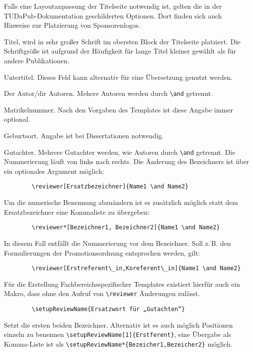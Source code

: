 \documentclass[
	german,%
	accentcolor=9c,%
	ruledheaders=section,%
	class=report,%
	thesis={type=bachelor},%
	fontsize=11pt,%
	parskip=half-,%
	custommargins=true,%
	marginpar=false,%
]{tudapub}
\begin{document}
Falls eine Layoutanpassung der Titelseite notwendig ist, gelten die in der TUDaPub-Dokumentation \cite{tudapub} geschilderten Optionen. Dort finden sich auch Hinweise zur Platzierung von Sponsorenlogos.

\begin{description}
	\item[title] Titel, wird in sehr großer Schrift im obersten Block der Titelseite platziert. Die Schriftgröße ist aufgrund der Häufigkeit für lange Titel kleiner gewählt als für andere Publikationen.
	\item[subtitle] Untertitel. Dieses Feld kann alternativ für eine Übersetzung genutzt werden.
	\item[author] Der Autor/dir Autoren. Mehere Autoren werden durch \verb+\and+ getrennt.
	\item[studentID] Matrikelnummer. Nach den Vorgaben des Templates ist diese Angabe immer optional.
	\item[birthplace] Geburtsort. Angabe ist bei Dissertationen notwendig.
	\item[reviewer] Gutachter. Mehrere Gutachter werden, wie Autoren durch \verb+\and+ getrennt. Die Nummerierung läuft von links nach rechts.
	      Die Änderung des Bezeichners ist über ein optionales Argument möglich:
\begin{verbatim}
        \reviewer[Ersatzbezeichner]{Name1 \and Name2}
\end{verbatim}
	      Um die numerische Benennung abzuändern ist es zusätzlich möglich statt dem Ersatzbezeichner eine Kommaliste zu übergeben:
\begin{verbatim}
        \reviewer*[Bezeichner1, Bezeichner2]{Name1 \and Name2}
\end{verbatim}
	      In diesem Fall entfällt die Nummerierung vor dem Bezeichner. Soll z.\,B. den Formulierungen der Promotionsordnung entsprochen werden, gilt:
\begin{verbatim}
        \reviewer[Erstreferent\_in,Koreferent\_in]{Name1 \and Name2}
\end{verbatim}
	      Für die Erstellung Fachbereichsspezifischer Templates existiert hierfür auch ein Makro, dass ohne den Aufruf von \verb+\reviewer+ Änderungen zulässt.
\begin{verbatim}
        \setupReviewName{Ersatzwort für „Gutachten“}
\end{verbatim}
	      Setzt die ersten beiden Bezeichner. Alternativ ist es auch möglich Positionen einzeln zu benennen \verb+\setupReviewName[1]{Erstferent}+, eine Übergabe als Komma-Liste ist als \verb+\setupReviewName*{Bezeicher1,Bezeicher2}+ möglich.


\end{description}
\end{document}
